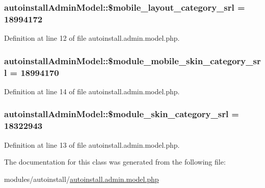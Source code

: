 \subsubsection[{\texorpdfstring{\$mobile\+\_\+layout\+\_\+category\+\_\+srl}{$mobile_layout_category_srl}}]{\setlength{\rightskip}{0pt plus 5cm}autoinstall\+Admin\+Model\+::\$mobile\+\_\+layout\+\_\+category\+\_\+srl = 18994172}\hypertarget{classautoinstallAdminModel_a7dca62f2e0f3e37c6f2562125cd8cf94}{}\label{classautoinstallAdminModel_a7dca62f2e0f3e37c6f2562125cd8cf94}


Definition at line 12 of file autoinstall.\+admin.\+model.\+php.

\subsubsection[{\texorpdfstring{\$module\+\_\+mobile\+\_\+skin\+\_\+category\+\_\+srl}{$module_mobile_skin_category_srl}}]{\setlength{\rightskip}{0pt plus 5cm}autoinstall\+Admin\+Model\+::\$module\+\_\+mobile\+\_\+skin\+\_\+category\+\_\+srl = 18994170}\hypertarget{classautoinstallAdminModel_add26efaa0308b61db15daa951bef678f}{}\label{classautoinstallAdminModel_add26efaa0308b61db15daa951bef678f}


Definition at line 14 of file autoinstall.\+admin.\+model.\+php.

\subsubsection[{\texorpdfstring{\$module\+\_\+skin\+\_\+category\+\_\+srl}{$module_skin_category_srl}}]{\setlength{\rightskip}{0pt plus 5cm}autoinstall\+Admin\+Model\+::\$module\+\_\+skin\+\_\+category\+\_\+srl = 18322943}\hypertarget{classautoinstallAdminModel_ad9e023f5b4f464ba2cbea5465d05ef69}{}\label{classautoinstallAdminModel_ad9e023f5b4f464ba2cbea5465d05ef69}


Definition at line 13 of file autoinstall.\+admin.\+model.\+php.



The documentation for this class was generated from the following file\+:\begin{DoxyCompactItemize}
\item 
modules/autoinstall/\hyperlink{autoinstall_8admin_8model_8php}{autoinstall.\+admin.\+model.\+php}\end{DoxyCompactItemize}
